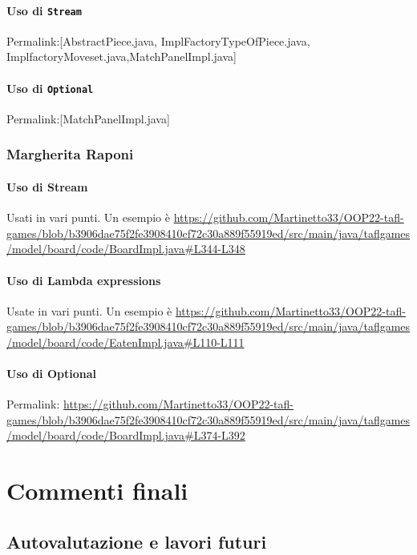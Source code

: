 \documentclass[a4paper,12pt]{report}
\begin{document}
\subsubsection{Uso di \texttt{Stream}}
Permalink:[AbstractPiece.java, ImplFactoryTypeOfPiece.java, ImplfactoryMoveset.java,MatchPanelImpl.java]

\subsubsection{Uso di \texttt{Optional}}
Permalink:[MatchPanelImpl.java]

\subsection{Margherita Raponi}

\subsubsection{Uso di Stream}
Usati in vari punti. Un esempio è \url{https://github.com/Martinetto33/OOP22-tafl-games/blob/b3906dae75f2fe3908410cf72c30a889f55919ed/src/main/java/taflgames/model/board/code/BoardImpl.java#L344-L348}

\subsubsection{Uso di Lambda expressions}
Usate in vari punti. Un esempio è \url{https://github.com/Martinetto33/OOP22-tafl-games/blob/b3906dae75f2fe3908410cf72c30a889f55919ed/src/main/java/taflgames/model/board/code/EatenImpl.java#L110-L111}

\subsubsection{Uso di Optional}
Permalink: \url{https://github.com/Martinetto33/OOP22-tafl-games/blob/b3906dae75f2fe3908410cf72c30a889f55919ed/src/main/java/taflgames/model/board/code/BoardImpl.java#L374-L392}


\chapter{Commenti finali}


\section{Autovalutazione e lavori futuri}
\end{document}
